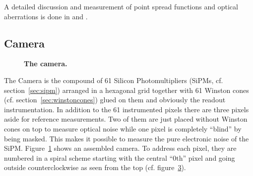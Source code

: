 A detailed discussion and measurement of point spread functions and optical aberrations is done in \cite{famous:niggemann} and \cite{famous:eichler}.

\subsection{Camera}\label{iceact:model:camera}

\begin{figure}[H]
	\centering
	\begin{subfigure}[t]{0.49\textwidth}
		\label{iceact:camera:picture}	
	\end{subfigure}
	\hfill
	\begin{subfigure}[t]{0.49\textwidth}
		\usebox{\savedimage}
		\label{iceact:camera:pixelnumbering}	
	\end{subfigure}
	\caption[The \iceact camera]{\textbf{The \iceact camera.}}	
\end{figure}

The \iceact Camera is the compound of 61 Silicon Photomultipliers (SiPMs, cf. section~\ref{sec:sipm}) arranged in a hexagonal grid together with 61 Winston cones (cf. section~\ref{sec:winstoncones}) glued on them and obviously the readout instrumentation. In addition to the 61 instrumented pixels there are three pixels aside for reference measurements. Two of them are just placed without Winston cones on top to measure optical noise while one pixel is completely \enquote{blind} by being masked. This makes it possible to measure the pure electronic noise of the SiPM. Figure~\ref{iceact:camera:picture} shows an assembled \iceact camera. To address each pixel, they are numbered in a spiral scheme starting with the central \enquote{0$\text{th}$} pixel and going outside counterclockwise as seen from the top (cf. figure~\ref{iceact:camera:pixelnumbering}).

